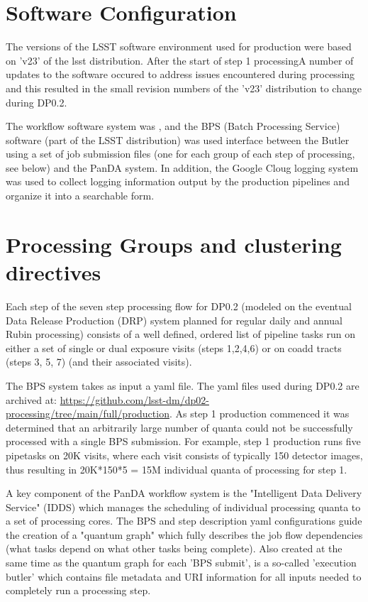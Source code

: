 \documentclass[OPS,authoryear,toc]{lsstdoc}
\begin{document}
\section{Software Configuration}

The versions of the LSST software environment used for production were
based on 'v23' of the lsst distribution.  After the start of step 1 processingA number of updates to
the software occured to address issues encountered during processing
and this resulted in the small revision numbers of the 'v23' distribution
to change during DP0.2.

The workflow software system was \cite{PanDA}, and the 
BPS (Batch Processing Service) software 
(part of the LSST distribution) was used interface between the Butler 
using a set of job submission files 
(one for each group of each step of processing, see below)
and the PanDA system. In addition, the Google Cloug logging system was
used to collect logging information output by the production pipelines and
organize it into a searchable form.

\section{Processing Groups and clustering directives}

Each step of the seven step processing flow for DP0.2 
(modeled on the eventual Data Release Production (DRP) system 
planned for regular daily and annual Rubin processing) consists of a well
defined, ordered list of pipeline tasks run on either a set of 
single or dual exposure visits (steps 1,2,4,6) or on 
coadd tracts (steps 3, 5, 7) (and their associated visits).  

The BPS system takes as input a yaml file. The yaml files used during DP0.2 are archived at: \url{https://github.com/lsst-dm/dp02-processing/tree/main/full/production}.  As step 1 production commenced it was determined that an arbitrarily
large number of quanta could not be successfully processed with a single
BPS submission.  For example, step 1 production runs five pipetasks on 
20K visits, where each visit consists of typically 150 detector images,
thus resulting in 20K*150*5 = 15M individual quanta of processing for
step 1.  

A key component of the PanDA workflow system is the "Intelligent Data Delivery Service" (IDDS) which manages the scheduling of individual processing
quanta to a set of processing cores. The BPS and step description yaml configurations guide the creation of a "quantum graph" which fully describes the job flow
dependencies (what tasks depend on what other tasks being complete).  Also
created at the same time as the quantum graph for each 'BPS submit', is a
so-called 'execution butler' which contains file metadata and 
URI information for all inputs needed to completely run a processing step.
\end{document}
